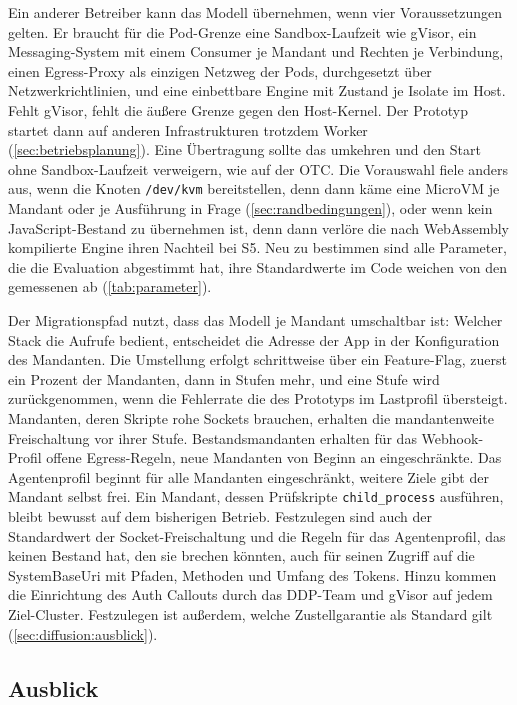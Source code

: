 Ein anderer Betreiber kann das Modell übernehmen, wenn vier Voraussetzungen gelten. Er braucht für die Pod-Grenze eine
Sandbox-Laufzeit wie gVisor, ein Messaging-System mit einem Consumer je Mandant und Rechten je Verbindung, einen
Egress-Proxy als einzigen Netzweg der Pods, durchgesetzt über Netzwerkrichtlinien, und eine einbettbare Engine mit
Zustand je Isolate im Host. Fehlt gVisor, fehlt die äußere Grenze gegen den Host-Kernel. Der Prototyp startet dann auf
anderen Infrastrukturen trotzdem Worker (\autoref{sec:betriebsplanung}). Eine Übertragung sollte das umkehren und den
Start ohne Sandbox-Laufzeit verweigern, wie auf der \ac{OTC}. Die Vorauswahl fiele anders aus, wenn die Knoten
\texttt{/dev/kvm} bereitstellen, denn dann käme eine MicroVM je Mandant oder je Ausführung in Frage
(\autoref{sec:randbedingungen}), oder wenn kein JavaScript-Bestand zu übernehmen ist, denn dann verlöre die nach
WebAssembly kompilierte Engine ihren Nachteil bei S5. Neu zu bestimmen sind alle Parameter, die die Evaluation
abgestimmt hat, ihre Standardwerte im Code weichen von den gemessenen ab (\autoref{tab:parameter}).

Der Migrationspfad nutzt, dass das Modell je Mandant umschaltbar ist: Welcher Stack die Aufrufe bedient, entscheidet die
Adresse der App in der Konfiguration des Mandanten. Die Umstellung erfolgt
schrittweise über ein Feature-Flag, zuerst ein Prozent der Mandanten, dann in Stufen mehr, und eine Stufe wird
zurückgenommen, wenn die Fehlerrate die des Prototyps im Lastprofil übersteigt. Mandanten, deren Skripte rohe Sockets
brauchen, erhalten die mandantenweite Freischaltung vor ihrer Stufe. Bestandsmandanten erhalten für das Webhook-Profil
offene Egress-Regeln, neue Mandanten von Beginn an eingeschränkte. Das Agentenprofil beginnt für alle Mandanten
eingeschränkt, weitere Ziele gibt der Mandant selbst frei. Ein Mandant, dessen Prüfskripte \texttt{child\_process}
ausführen, bleibt bewusst auf dem bisherigen Betrieb. Festzulegen
sind auch der Standardwert der Socket-Freischaltung und die Regeln für das Agentenprofil, das keinen Bestand hat, den sie
brechen könnten, auch für seinen Zugriff auf die SystemBaseUri mit Pfaden, Methoden und Umfang des Tokens. Hinzu kommen
die Einrichtung des Auth Callouts durch das \acs{DDP}-Team und gVisor auf jedem Ziel-Cluster. Festzulegen ist außerdem, welche Zustellgarantie als Standard gilt
(\autoref{sec:diffusion:ausblick}).

\subsection{Ausblick}
\label{sec:diffusion:ausblick}

